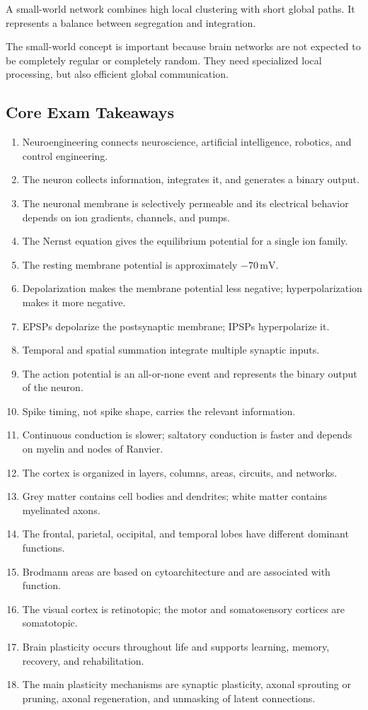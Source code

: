 A small-world network combines high local clustering with short global paths. It represents a balance between segregation and integration.

\begin{authornote}
The small-world concept is important because brain networks are not expected to be completely regular or completely random. They need specialized local processing, but also efficient global communication.
\end{authornote}

\subsection{Core Exam Takeaways}

\begin{enumerate}
    \item Neuroengineering connects neuroscience, artificial intelligence, robotics, and control engineering.
    \item The neuron collects information, integrates it, and generates a binary output.
    \item The neuronal membrane is selectively permeable and its electrical behavior depends on ion gradients, channels, and pumps.
    \item The Nernst equation gives the equilibrium potential for a single ion family.
    \item The resting membrane potential is approximately $-70\,\text{mV}$.
    \item Depolarization makes the membrane potential less negative; hyperpolarization makes it more negative.
    \item EPSPs depolarize the postsynaptic membrane; IPSPs hyperpolarize it.
    \item Temporal and spatial summation integrate multiple synaptic inputs.
    \item The action potential is an all-or-none event and represents the binary output of the neuron.
    \item Spike timing, not spike shape, carries the relevant information.
    \item Continuous conduction is slower; saltatory conduction is faster and depends on myelin and nodes of Ranvier.
    \item The cortex is organized in layers, columns, areas, circuits, and networks.
    \item Grey matter contains cell bodies and dendrites; white matter contains myelinated axons.
    \item The frontal, parietal, occipital, and temporal lobes have different dominant functions.
    \item Brodmann areas are based on cytoarchitecture and are associated with function.
    \item The visual cortex is retinotopic; the motor and somatosensory cortices are somatotopic.
    \item Brain plasticity occurs throughout life and supports learning, memory, recovery, and rehabilitation.
    \item The main plasticity mechanisms are synaptic plasticity, axonal sprouting or pruning, axonal regeneration, and unmasking of latent connections.


\end{enumerate}

